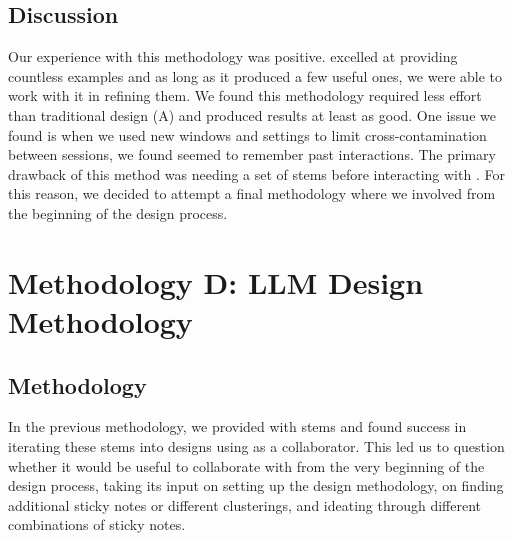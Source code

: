 
\subsection{Discussion}

Our experience with this methodology was positive. \gpt excelled at providing countless examples and as long as it produced a few useful ones, we were able to work with it in refining them. We found this methodology required less effort than traditional design (A) and produced results at least as good. One issue we found is when we used new windows and settings to limit cross-contamination between sessions, we found \gpt seemed to remember past interactions. The primary drawback of this method was needing a set of stems before interacting with \gpt. For this reason, we decided to attempt a final methodology where we involved \gpt from the beginning of the design process. 


\section{Methodology D: LLM Design Methodology}
\label{sec:meth4}

\subsection{Methodology}


In the previous methodology, we provided \gpt with stems and found success in iterating these stems into designs using \gpt as a collaborator.  This led us to question whether it would be useful to collaborate with \gpt from the very beginning of the design process, taking its input on setting up the design methodology, on finding additional sticky notes or different clusterings, and ideating through different combinations of sticky notes.

